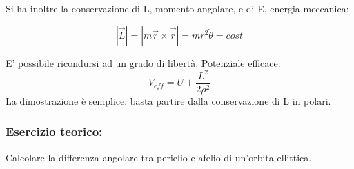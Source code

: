 \documentclass{article}
\begin{document}
Si ha inoltre la conservazione di L, momento angolare, e di E, energia meccanica:

\begin{equation}
    |\vec{L}|= |m\vec{r}\times \vec{\dot{r}}|= m r^2 \dot{\theta}= cost
\end{equation}


E' possibile ricondursi ad un grado di libertà.
Potenziale efficace:
\begin{equation}
    V_{eff}=U+\frac{L^2}{2\rho^2}
\end{equation}
La dimostrazione è semplice: basta partire dalla conservazione di L in polari.


\subsubsection*{Esercizio teorico:}
Calcolare la differenza angolare tra perielio e afelio di un'orbita ellittica.
\end{document}

